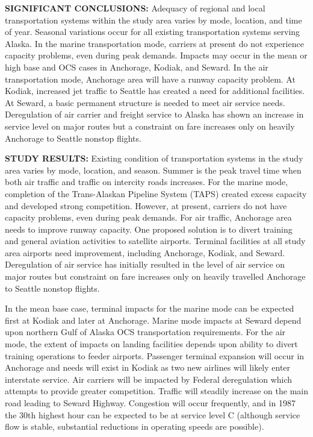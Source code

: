 \documentclass[11pt,a4paper]{article}
\begin{document}
\textbf{SIGNIFICANT CONCLUSIONS:} Adequacy of regional and local transportation systems within the study area varies by mode, location, and time of year.  Seasonal variations occur for all existing transportation systems serving Alaska.  In the marine transportation mode, carriers at present do not experience capacity problems, even during peak demands.  Impacts may occur in the mean or high base and OCS cases in Anchorage, Kodiak, and Seward.  In the air transportation mode, Anchorage area will have a runway capacity problem.  At Kodiak, increased jet traffic to Seattle has created a need for additional facilities.  At Seward, a basic permanent structure is needed to meet air service needs.  Deregulation of air carrier and freight service to Alaska has shown an increase in service level on major routes but a constraint on fare increases only on heavily Anchorage to Seattle nonstop flights.

\textbf{STUDY RESULTS:} Existing condition of transportation systems in the study area varies by mode, location, and season.  Summer is the peak travel time when both air traffic and traffic on intercity roads increases.  For the marine mode, completion of the Trans-Alaskan Pipeline System (TAPS) created excess capacity and developed strong competition.  However, at present, carriers do not have capacity problems, even during peak demands.  For air traffic, Anchorage area needs to improve runway capacity.  One proposed solution is to divert training and general aviation activities to satellite airports.  Terminal facilities at all study area airports need improvement, including Anchorage, Kodiak, and Seward.  Deregulation of air service has initially resulted in the level of air service on major routes but constraint on fare increases only on heavily travelled Anchorage to Seattle nonstop flights.

In the mean base case, terminal impacts for the marine mode can be expected first at Kodiak and later at Anchorage.  Marine mode impacts at Seward depend upon northern Gulf of Alaska OCS transportation requirements.  For the air mode, the extent of impacts on landing facilities depends upon ability to divert training operations to feeder airports.  Passenger terminal expansion will occur in Anchorage and needs will exist in Kodiak as two new airlines will likely enter interstate service.  Air carriers will be impacted by Federal deregulation which attempts to provide greater competition.  Traffic will steadily increase on the main road leading to Seward Highway.  Congestion will occur frequently, and in 1987 the 30th highest hour can be expected to be at service level C (although service flow is stable, substantial reductions in operating speeds are possible).
\end{document}

